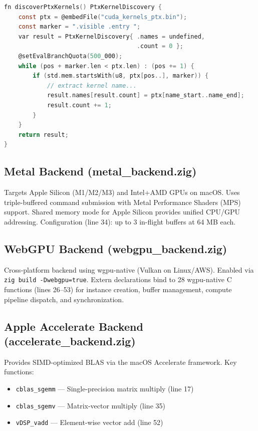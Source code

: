\documentclass[11pt]{article}
\begin{document}
\begin{lstlisting}[language=C,caption={Comptime PTX discovery (cuda\_backend.zig:52--77)}]
fn discoverPtxKernels() PtxKernelDiscovery {
    const ptx = @embedFile("cuda_kernels_ptx.bin");
    const marker = ".visible .entry ";
    var result = PtxKernelDiscovery{ .names = undefined,
                                     .count = 0 };
    @setEvalBranchQuota(500_000);
    while (pos + marker.len < ptx.len) : (pos += 1) {
        if (std.mem.startsWith(u8, ptx[pos..], marker)) {
            // extract kernel name...
            result.names[result.count] = ptx[name_start..name_end];
            result.count += 1;
        }
    }
    return result;
}
\end{lstlisting}

\subsection{Metal Backend (metal\_backend.zig)}

Targets Apple Silicon (M1/M2/M3) and Intel+AMD GPUs on macOS. Uses
triple-buffered command submission with Metal Performance Shaders (MPS)
support. Shared memory mode for Apple Silicon provides unified CPU/GPU
addressing. Configuration (line 34): up to 3 in-flight buffers at 64 MB each.

\subsection{WebGPU Backend (webgpu\_backend.zig)}

Cross-platform backend using wgpu-native (Vulkan on Linux/AWS). Enabled via
\texttt{zig build -Dwebgpu=true}. Extern declarations bind to 28 wgpu-native
C functions (lines 26--53) for instance creation, buffer management, compute
pipeline dispatch, and synchronization.

\subsection{Apple Accelerate Backend (accelerate\_backend.zig)}

Provides SIMD-optimized BLAS via the macOS Accelerate framework. Key functions:
\begin{itemize}
  \item \texttt{cblas\_sgemm} --- Single-precision matrix multiply (line 17)
  \item \texttt{cblas\_sgemv} --- Matrix-vector multiply (line 35)
  \item \texttt{vDSP\_vadd} --- Element-wise vector add (line 52)
\end{itemize}
\end{document}
